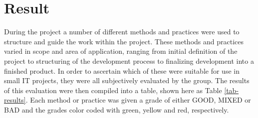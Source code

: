 
\section{Result}

During the project a number of different methods and practices were used to structure and guide the work within the project. These methods and practices varied in scope and area of application, ranging from initial definition of the project to structuring of the development process to finalizing development into a finished product. In order to ascertain which of these were suitable for use in small IT projects, they were all subjectively evaluated by the group. The results of this evaluation were then compiled into a table, shown here as Table \ref{tab-results}. Each method or practice was given a grade of either GOOD, MIXED or BAD and the grades color coded with green, yellow and red, respectively.

